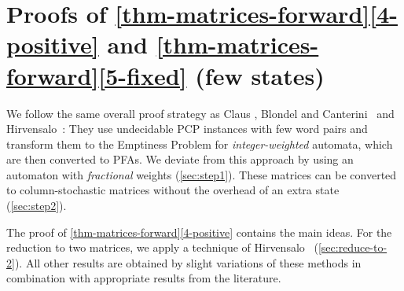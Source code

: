 \documentclass[a4paper,cleveref, autoref, thm-restate]{lipics-v2021}
\begin{document}

\section{Proofs of \autoref{thm-matrices-forward}\ref{4-positive}
  and  \autoref{thm-matrices-forward}\ref{5-fixed} (few states)}
\label{sec:more-than-two}

  We follow the same overall proof strategy as
Claus
 \cite{claus81}, %
  Blondel and Canterini~\cite{blondel-canterini-03} and Hirvensalo~\cite{hirvensalo07}:
  They 
  use undecidable PCP instances with few word pairs and transform them
  to the Emptiness Problem for \emph{integer-weighted} automata, which are
  then
  converted to PFAs.
 We deviate from this approach by using an automaton with \emph{fractional}
 weights  (\autoref{sec:step1}).
These matrices can be converted to column-stochastic matrices without
the overhead of an extra state (\autoref{sec:step2}).

 The proof of \autoref{thm-matrices-forward}\ref{4-positive} contains
 the main ideas.
For the reduction to two matrices, we apply a technique of 
 Hirvensalo~\cite{hirvensalo07} (\autoref{sec:reduce-to-2}).
 All other results are obtained by slight variations of these methods
in combination with appropriate results from the literature.
\end{document}
